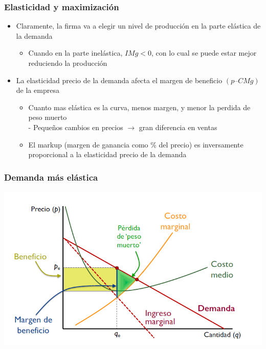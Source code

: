 \documentclass{beamer}
\begin{document}
\begin{frame}
\frametitle{Elasticidad y maximización}
\begin{itemize}
    \item Claramente, la firma va a elegir un nivel de producción en la parte elástica de la demanda\vspace{2mm}
    \begin{itemize}
        \item Cuando en la parte inelástica, $IMg < 0$, con lo cual se puede estar mejor reduciendo la producción\vspace{4mm}
    \end{itemize}
    \item La elasticidad precio de la demanda afecta el margen de beneficio $(p – CMg)$ de la empresa\vspace{2mm}
    \begin{itemize}
        \item Cuanto mas elástica es la curva, menos margen, y menor la perdida de peso muerto \\
        - Pequeños cambios en precios $\rightarrow$ gran diferencia en ventas
        \item El markup (margen de ganancia como \% del precio) es inversamente proporcional a la elasticidad precio de la demanda
    \end{itemize}
\end{itemize}
\end{frame}

\begin{frame}
\frametitle{Demanda más elástica}
\includegraphics[scale=0.6]{../Figures/Tema_06.47_elasticidad3.png}
\end{frame}
\end{document}
